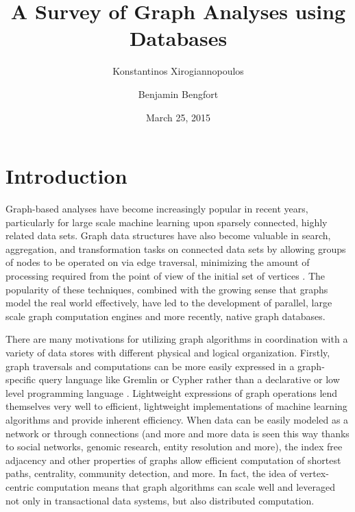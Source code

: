 \documentclass[11pt,letterpaper]{article}
\begin{document}
\title{A Survey of Graph Analyses using Databases}

\author[ ]{Konstantinos Xirogiannopoulos}
\author[ ]{Benjamin Bengfort}

\date{March 25, 2015}

\maketitle


\section*{Introduction}

Graph-based analyses have become increasingly popular in recent years, particularly for large scale machine learning upon sparsely connected, highly related data sets. Graph data structures have also become valuable in search, aggregation, and transformation tasks on connected data sets by allowing groups of nodes to be operated on via edge traversal, minimizing the amount of processing required from the point of view of the initial set of vertices \cite{berretti_efficient_2001}. The popularity of these techniques, combined with the growing sense that graphs model the real world effectively, have led to the development of parallel, large scale graph computation  engines and more recently, native graph databases.

There are many motivations for utilizing graph algorithms in coordination with a variety of data stores with different physical and logical organization. Firstly, graph traversals and computations can be more easily expressed in a graph-specific query language like Gremlin \cite{rodriguez_gremlin_2013} or Cypher \cite{miller_graph_2013} rather than a declarative or low level programming language \cite{rodriguez_exploring_2012}. Lightweight expressions of graph operations lend themselves very well to efficient, lightweight implementations of machine learning algorithms and provide inherent efficiency. When data can be easily modeled as a network or through connections (and more and more data is seen this way thanks to social networks, genomic research, entity resolution and more), the index free adjacency and other properties of graphs allow efficient computation of shortest paths, centrality, community detection, and more. In fact, the idea of vertex-centric computation \cite{malewicz_pregel:_2010} means that graph algorithms can scale well and leveraged not only in transactional data systems, but also distributed computation.
\end{document}
